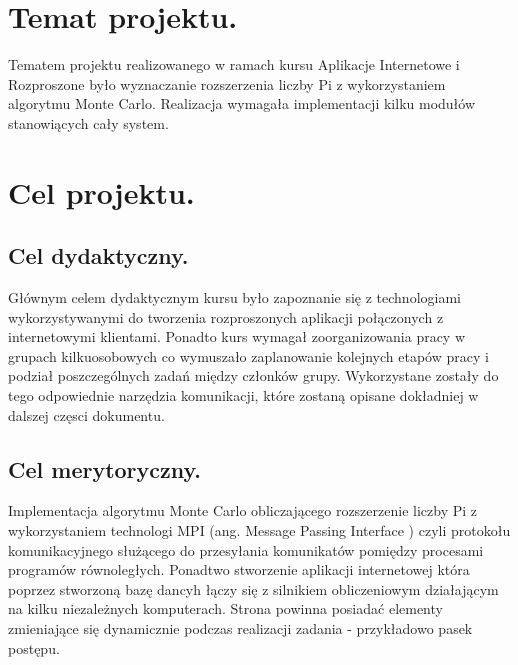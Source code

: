 \documentclass[a4paper,12pt]{article}		%
\begin{document}

\newpage
\tableofcontents
\newpage


\section{Temat projektu.}
Tematem projektu realizowanego w ramach kursu Aplikacje Internetowe i Rozproszone było wyznaczanie rozszerzenia liczby Pi z wykorzystaniem algorytmu Monte Carlo. Realizacja wymagała implementacji kilku modułów stanowiących cały system.

\section{Cel projektu.}

\subsection{Cel dydaktyczny.}
Głównym celem dydaktycznym kursu było zapoznanie się z technologiami wykorzystywanymi do tworzenia rozproszonych aplikacji połączonych z internetowymi klientami. Ponadto kurs wymagał zoorganizowania pracy w grupach kilkuosobowych co wymuszało zaplanowanie kolejnych etapów pracy i podział poszczególnych zadań między członków grupy. Wykorzystane zostały do tego odpowiednie narzędzia komunikacji, które zostaną opisane dokładniej w dalszej częsci dokumentu. 

\subsection{Cel merytoryczny.}
Implementacja algorytmu Monte Carlo obliczającego rozszerzenie liczby Pi z wykorzystaniem technologi MPI (ang. Message Passing Interface ) czyli protokołu komunikacyjnego służącego do przesyłania komunikatów pomiędzy procesami programów równoległych. Ponadtwo stworzenie aplikacji internetowej która poprzez stworzoną bazę dancyh łączy się z silnikiem obliczeniowym działającym na kilku niezależnych komputerach. Strona powinna posiadać elementy zmieniające się dynamicznie podczas realizacji zadania - przykładowo pasek postępu. 
\newpage
\end{document}
